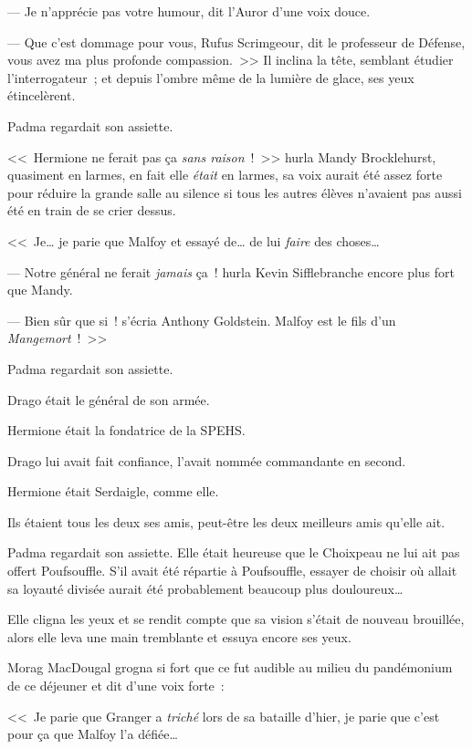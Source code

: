 --- Je n'apprécie pas votre humour, dit l'Auror d'une voix douce.

--- Que c'est dommage pour vous, Rufus Scrimgeour, dit le professeur de Défense, vous avez ma plus profonde compassion.~>> Il inclina la tête, semblant étudier l'interrogateur~; et depuis l'ombre même de la lumière de glace, ses yeux étincelèrent.

\later

Padma regardait son assiette.

<<~Hermione ne ferait pas ça \emph{sans raison}~!~>> hurla Mandy Brocklehurst, quasiment en larmes, en fait elle \emph{était} en larmes, sa voix aurait été assez forte pour réduire la grande salle au silence si tous les autres élèves n'avaient pas aussi été en train de se crier dessus.

<<~Je… je parie que Malfoy et essayé de… de lui \emph{faire} des choses…

--- Notre général ne ferait \emph{jamais} ça~! hurla Kevin Sifflebranche encore plus fort que Mandy.

--- Bien sûr que si~! s'écria Anthony Goldstein. Malfoy est le fils d'un \emph{Mangemort}~!~>>

\later

Padma regardait son assiette.

Drago était le général de son armée.

Hermione était la fondatrice de la SPEHS.

Drago lui avait fait confiance, l'avait nommée commandante en second.

Hermione était Serdaigle, comme elle.

Ils étaient tous les deux ses amis, peut-être les deux meilleurs amis qu'elle ait.

Padma regardait son assiette. Elle était heureuse que le Choixpeau ne lui ait pas offert Poufsouffle. S'il avait été répartie à Poufsouffle, essayer de choisir où allait sa loyauté divisée aurait été probablement beaucoup plus douloureux…

Elle cligna les yeux et se rendit compte que sa vision s'était de nouveau brouillée, alors elle leva une main tremblante et essuya encore ses yeux.

Morag MacDougal grogna si fort que ce fut audible au milieu du pandémonium de ce déjeuner et dit d'une voix forte~:

<<~Je parie que Granger a \emph{triché} lors de sa bataille d'hier, je parie que c'est pour ça que Malfoy l'a défiée…

